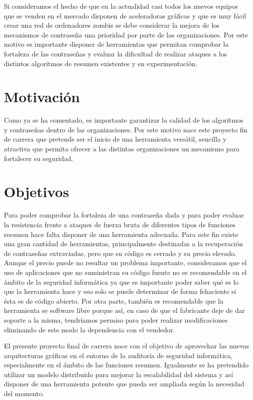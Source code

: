 Si consideramos el hecho de que en la actualidad casi todos los nuevos equipos que se venden en el mercado disponen de aceleradoras gráficas y que es muy fácil crear una red de ordenadores zombis se debe considerar la mejora de los mecanismos de contraseña una prioridad por parte de las organizaciones. Por este motivo es importante disponer de herramientas que permitan comprobar la fortaleza de las contraseñas y evaluar la dificultad de realizar ataques a los distintos algoritmos de resumen existentes y en experimentación.

\section{Motivación}

Como ya se ha comentado, es importante garantizar la calidad de los algoritmos y contraseñas dentro de las organizaciones. Por este motivo nace este proyecto fin de carrera que pretende ser el inicio de una herramienta versátil, sencilla y atractiva que permita ofrecer a las distintas organizaciones un mecanismo para fortalecer su seguridad.

\section{Objetivos}

Para poder comprobar la fortaleza de una contraseña dada y para poder evaluar la resistencia frente a ataques de fuerza bruta de diferentes tipos de funciones resumen hace falta disponer de una herramienta adecuada. Para este fin existe una gran cantidad de herramientas, principalmente destinadas a la recuperación de contraseñas extraviadas, pero que su código es cerrado y su precio elevado. Aunque el precio puede no resultar un problema importante, consideramos que el uso de aplicaciones que no suministran su código fuente no es recomendable en el ámbito de la seguridad informática ya que es importante poder saber qué es lo que la herramienta hace y eso solo se puede determinar de forma fehaciente si ésta es de código abierto. Por otra parte, también es recomendable que la herramienta se software libre porque así, en caso de que el fabricante deje de dar soporte a la misma, tendríamos permiso para poder realizar modificaciones eliminando de este modo la dependencia con el vendedor.

El presente proyecto final de carrera nace con el objetivo de aprovechar las nuevas arquitecturas gráficas en el entorno de la auditoría de seguridad informática, especialmente en el ámbito de las funciones resumen. Igualmente se ha pretendido utilizar un modelo distribuido para mejorar la escalabilidad del sistema y así disponer de una herramienta potente que pueda ser ampliada según la necesidad del momento.

